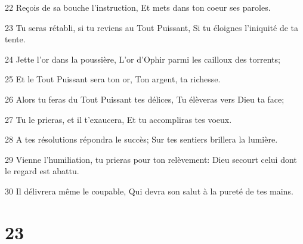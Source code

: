 \par 22 Reçois de sa bouche l'instruction, Et mets dans ton coeur ses paroles.
\par 23 Tu seras rétabli, si tu reviens au Tout Puissant, Si tu éloignes l'iniquité de ta tente.
\par 24 Jette l'or dans la poussière, L'or d'Ophir parmi les cailloux des torrents;
\par 25 Et le Tout Puissant sera ton or, Ton argent, ta richesse.
\par 26 Alors tu feras du Tout Puissant tes délices, Tu élèveras vers Dieu ta face;
\par 27 Tu le prieras, et il t'exaucera, Et tu accompliras tes voeux.
\par 28 A tes résolutions répondra le succès; Sur tes sentiers brillera la lumière.
\par 29 Vienne l'humiliation, tu prieras pour ton relèvement: Dieu secourt celui dont le regard est abattu.
\par 30 Il délivrera même le coupable, Qui devra son salut à la pureté de tes mains.

\chapter{23}

